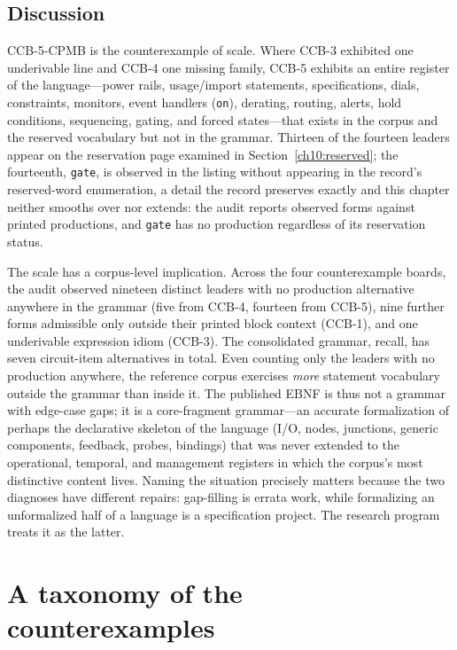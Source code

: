 \subsection{Discussion}

CCB-5-CPMB is the counterexample of scale. Where CCB-3 exhibited one underivable line and CCB-4 one missing family, CCB-5 exhibits an entire register of the language---power rails, usage/import statements, specifications, dials, constraints, monitors, event handlers (\texttt{on}), derating, routing, alerts, hold conditions, sequencing, gating, and forced states---that exists in the corpus and the reserved vocabulary but not in the grammar. Thirteen of the fourteen leaders appear on the reservation page examined in Section~\ref{ch10:reserved}; the fourteenth, \texttt{gate}, is observed in the listing without appearing in the record's reserved-word enumeration, a detail the record preserves exactly and this chapter neither smooths over nor extends: the audit reports observed forms against printed productions, and \texttt{gate} has no production regardless of its reservation status.

The scale has a corpus-level implication. Across the four counterexample boards, the audit observed nineteen distinct leaders with no production alternative anywhere in the grammar (five from CCB-4, fourteen from CCB-5), nine further forms admissible only outside their printed block context (CCB-1), and one underivable expression idiom (CCB-3). The consolidated grammar, recall, has seven circuit-item alternatives in total. Even counting only the leaders with no production anywhere, the reference corpus exercises \emph{more} statement vocabulary outside the grammar than inside it. The published EBNF is thus not a grammar with edge-case gaps; it is a core-fragment grammar---an accurate formalization of perhaps the declarative skeleton of the language (I/O, nodes, junctions, generic components, feedback, probes, bindings) that was never extended to the operational, temporal, and management registers in which the corpus's most distinctive content lives. Naming the situation precisely matters because the two diagnoses have different repairs: gap-filling is errata work, while formalizing an unformalized half of a language is a specification project. The research program treats it as the latter.

\section{A taxonomy of the counterexamples}\label{ch10:taxonomy}

